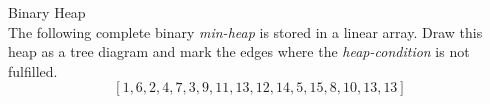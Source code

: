  Binary Heap \\
The following complete binary \textit{min-heap} is stored in a linear array.
Draw this heap as a tree diagram and mark the edges where the
\textit{heap-condition} is not fulfilled.
\begin{displaymath}
  \left[ 1,6,2,4,7,3,9,11,13,12,14,5,15,8,10,13,13 \right]
\end{displaymath}